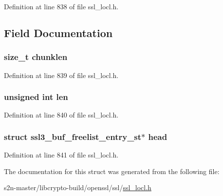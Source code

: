 Definition at line 838 of file ssl\+\_\+locl.\+h.



\subsection{Field Documentation}
\subsubsection[{\texorpdfstring{chunklen}{chunklen}}]{\setlength{\rightskip}{0pt plus 5cm}size\+\_\+t chunklen}\hypertarget{structssl3__buf__freelist__st_af003d62de43bc626a7449370fb56b21a}{}\label{structssl3__buf__freelist__st_af003d62de43bc626a7449370fb56b21a}


Definition at line 839 of file ssl\+\_\+locl.\+h.

\subsubsection[{\texorpdfstring{len}{len}}]{\setlength{\rightskip}{0pt plus 5cm}unsigned int len}\hypertarget{structssl3__buf__freelist__st_a77124bd5f7e31e6fffc19f335da0c23f}{}\label{structssl3__buf__freelist__st_a77124bd5f7e31e6fffc19f335da0c23f}


Definition at line 840 of file ssl\+\_\+locl.\+h.

\subsubsection[{\texorpdfstring{head}{head}}]{\setlength{\rightskip}{0pt plus 5cm}struct {\bf ssl3\+\_\+buf\+\_\+freelist\+\_\+entry\+\_\+st}$\ast$ head}\hypertarget{structssl3__buf__freelist__st_aa438b9a4f3360d6a51ff073e584f1809}{}\label{structssl3__buf__freelist__st_aa438b9a4f3360d6a51ff073e584f1809}


Definition at line 841 of file ssl\+\_\+locl.\+h.



The documentation for this struct was generated from the following file\+:\begin{DoxyCompactItemize}
\item 
s2n-\/master/libcrypto-\/build/openssl/ssl/\hyperlink{ssl__locl_8h}{ssl\+\_\+locl.\+h}\end{DoxyCompactItemize}
